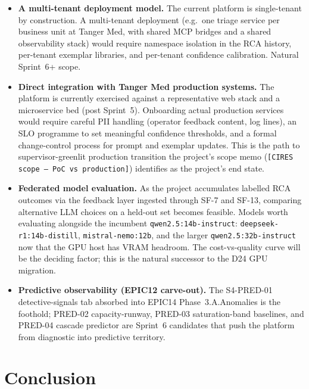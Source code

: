 \documentclass[11pt,a4paper,oneside]{report}
\begin{document}
\begin{itemize}
  \item \textbf{A multi-tenant deployment model.}  The current
        platform is single-tenant by construction.  A multi-tenant
        deployment (e.g.\ one triage service per business unit at
        Tanger Med, with shared MCP bridges and a shared
        observability stack) would require namespace isolation in
        the RCA history, per-tenant exemplar libraries, and
        per-tenant confidence calibration.  Natural Sprint~6+
        scope.
  \item \textbf{Direct integration with Tanger Med production
        systems.}  The platform is currently exercised against a
        representative web stack and a microservice bed (post
        Sprint~5).  Onboarding actual production services would
        require careful PII handling (operator feedback content,
        log lines), an SLO programme to set meaningful confidence
        thresholds, and a formal change-control process for
        prompt and exemplar updates.  This is the path to
        supervisor-greenlit production transition the project's
        scope memo (\texttt{[CIRES scope --- PoC vs production]})
        identifies as the project's end state.
  \item \textbf{Federated model evaluation.}  As the project
        accumulates labelled RCA outcomes via the feedback layer
        ingested through SF-7 and SF-13, comparing alternative
        LLM choices on a held-out set becomes feasible.  Models
        worth evaluating alongside the incumbent
        \texttt{qwen2.5:14b-instruct}:
        \texttt{deepseek-r1:14b-distill},
        \texttt{mistral-nemo:12b}, and the larger
        \texttt{qwen2.5:32b-instruct} now that the GPU host has
        VRAM headroom.  The cost-vs-quality curve will be the
        deciding factor; this is the natural successor to the
        D24 GPU migration.
  \item \textbf{Predictive observability (EPIC12 carve-out).}
        The S4-PRED-01 detective-signals tab absorbed into
        EPIC14 Phase~3.A.Anomalies is the foothold; PRED-02
        capacity-runway, PRED-03 saturation-band baselines, and
        PRED-04 cascade predictor are Sprint~6 candidates that
        push the platform from diagnostic into predictive
        territory.
\end{itemize}

\chapter{Conclusion}
\label{ch:conclusion}
\end{document}

